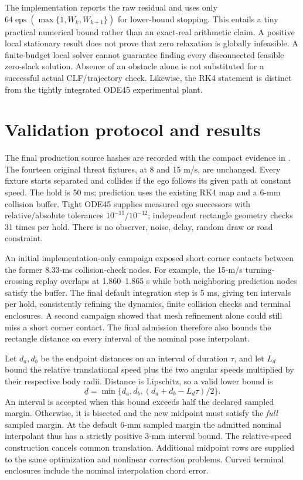 \documentclass[11pt]{article}
\begin{document}
The implementation reports the raw residual and uses only
\(64\operatorname{eps}(\max\{1,W_k,W_{k+1}\})\) for lower-bound stopping.
This entails a tiny practical numerical bound rather than an exact-real
arithmetic claim. A positive local stationary result does not prove that
zero relaxation is globally infeasible. A finite-budget local solver
cannot guarantee finding every disconnected feasible zero-slack solution.
Absence of an obstacle alone is not substituted for a successful actual
CLF/trajectory check. Likewise, the RK4 statement is distinct from the
tightly integrated ODE45 experimental plant.

\section{Validation protocol and results}
The final production source hashes are recorded with the compact evidence
in . The fourteen original threat
fixtures, at 8 and 15 m/s, are unchanged. Every fixture starts separated
and collides if the ego follows its given path at constant speed.
The hold is 50 ms; prediction uses the existing RK4 map and a 6-mm
collision buffer. Tight ODE45 supplies measured ego successors with
relative/absolute tolerances $10^{-11}$/$10^{-12}$; independent rectangle
geometry checks 31 times per hold. There is no observer, noise, delay,
random draw or road constraint.

An initial implementation-only campaign exposed short corner contacts
between the former 8.33-ms collision-check nodes. For example, the
15-m/s turning-crossing replay overlaps at 1.860--1.865 s while both
neighboring prediction nodes satisfy the buffer. The final default
integration step is 5 ms, giving ten intervals per hold, consistently
refining the dynamics, finite collision checks and terminal enclosures.
A second campaign showed that mesh refinement alone could still miss a
short corner contact. The final admission therefore also bounds the
rectangle distance on every interval of the nominal pose interpolant.

Let $d_a,d_b$ be the endpoint distances on an interval of duration $\tau$,
and let $L_d$ bound the relative translational speed plus the two angular
speeds multiplied by their respective body radii. Distance is Lipschitz,
so a valid lower bound is
\[
\underline d=\min\{d_a,d_b,(d_a+d_b-L_d\tau)/2\}.
\]
An interval is accepted when this bound exceeds half the declared sampled
margin. Otherwise, it is bisected and the new midpoint must satisfy the
\emph{full} sampled margin. At the default 6-mm sampled margin the
admitted nominal interpolant thus has a strictly positive 3-mm interval
bound. The relative-speed construction cancels common translation.
Additional midpoint rows are supplied to the same optimization and
nonlinear correction problems. Curved terminal enclosures include the
nominal interpolation chord error.
\end{document}
